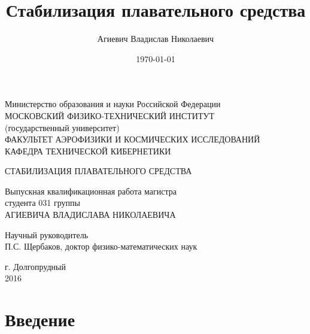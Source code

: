 \documentclass[12pt,a4paper]{article}
\title{Стабилизация плавательного средства}
\author{Агиевич Владислав Николаевич}
\date{\today}
\begin{document}
\begin{titlepage}

\begin{center}
Министерство образования и науки Российской Федерации \\
МОСКОВСКИЙ ФИЗИКО-ТЕХНИЧЕСКИЙ ИНСТИТУТ \\
(государственный университет) \\
ФАКУЛЬТЕТ АЭРОФИЗИКИ И КОСМИЧЕСКИХ ИССЛЕДОВАНИЙ \\
КАФЕДРА ТЕХНИЧЕСКОЙ КИБЕРНЕТИКИ \\
\end{center}

\vspace{3cm}

\begin{center}
СТАБИЛИЗАЦИЯ ПЛАВАТЕЛЬНОГО СРЕДСТВА \\
\end{center}

\vspace{3cm}

\begin{center}
Выпускная квалификационная работа магистра \\
студента 031 группы \\
АГИЕВИЧА ВЛАДИСЛАВА НИКОЛАЕВИЧА \\
\end{center}

\vspace{3cm}
\begin{center}
Научный руководитель \\
П.С. Щербаков, доктор физико-математических наук \\
\end{center}

\vspace{3cm}

\begin{center}
г. Долгопрудный \\
2016 \\
\end{center}

\end{titlepage}

\newpage

\tableofcontents

\newpage

\section{Введение} 
\end{document}
